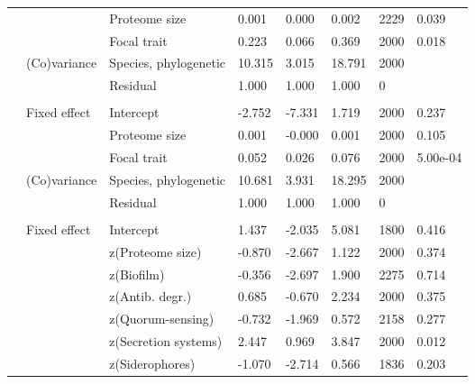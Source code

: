 \begin{table}
\begin{tabular}[t]{llllllll}
\hspace{1em} &  & Proteome size & 0.001 & 0.000 & 0.002 & 2229 & 0.039\\
\hspace{1em} &  & Focal trait & 0.223 & 0.066 & 0.369 & 2000 & 0.018\\
\hspace{1em} & (Co)variance & Species, phylogenetic & 10.315 & 3.015 & 18.791 & 2000 & \\
\hspace{1em} &  & Residual & 1.000 & 1.000 & 1.000 & 0 \vphantom{2} & \\
\addlinespace[0.3em]
\multicolumn{8}{l}{\textbf{Virulence factors}}\\
\hspace{1em} & Fixed effect & Intercept & -2.752 & -7.331 & 1.719 & 2000 & 0.237\\
\hspace{1em} &  & Proteome size & 0.001 & -0.000 & 0.001 & 2000 & 0.105\\
\hspace{1em} &  & Focal trait & 0.052 & 0.026 & 0.076 & 2000 & 5.00e-04\\
\hspace{1em} & (Co)variance & Species, phylogenetic & 10.681 & 3.931 & 18.295 & 2000 & \\
\hspace{1em} &  & Residual & 1.000 & 1.000 & 1.000 & 0 \vphantom{1} & \\
\addlinespace[0.3em]
\multicolumn{8}{l}{\textbf{Multivariate model}}\\
\hspace{1em} & Fixed effect & Intercept & 1.437 & -2.035 & 5.081 & 1800 & 0.416\\
\hspace{1em} &  & z(Proteome size) & -0.870 & -2.667 & 1.122 & 2000 & 0.374\\
\hspace{1em} &  & z(Biofilm) & -0.356 & -2.697 & 1.900 & 2275 & 0.714\\
\hspace{1em} &  & z(Antib. degr.) & 0.685 & -0.670 & 2.234 & 2000 & 0.375\\
\hspace{1em} &  & z(Quorum-sensing) & -0.732 & -1.969 & 0.572 & 2158 & 0.277\\
\hspace{1em} &  & z(Secretion systems) & 2.447 & 0.969 & 3.847 & 2000 & 0.012\\
\hspace{1em} &  & z(Siderophores) & -1.070 & -2.714 & 0.566 & 1836 & 0.203\\

\end{tabular}
\end{table}
